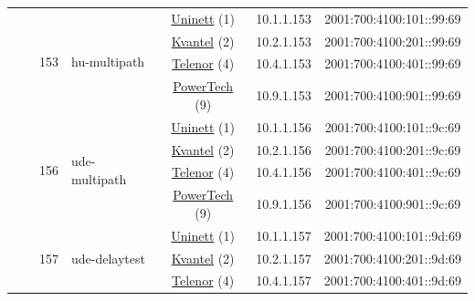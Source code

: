 \begin{small}
\begin{center}
\begin{longtable}{|c|c|c|c|c|c|c|c|}
  &  & \multirow{4}{*}{\tiny{153}} & \multicolumn{1}{|l|}{\multirow{4}{*}{\tiny{hu-multipath}}} & \multicolumn{2}{|c|}{\tiny{\href{https://www.uninett.no}{Uninett} (1)}} & \tiny{10.1.1.153} & \tiny{2001:700:4100:101::99:69} \\* \cline{5-5}\cline{6-6}\cline{7-7}\cline{8-8}
  &  &  &  & \multicolumn{2}{|c|}{\tiny{\href{http://kvantel.no}{Kvantel} (2)}} & \tiny{10.2.1.153} & \tiny{2001:700:4100:201::99:69} \\* \cline{5-5}\cline{6-6}\cline{7-7}\cline{8-8}
  &  &  &  & \multicolumn{2}{|c|}{\tiny{\href{https://www.telenor.no}{Telenor} (4)}} & \tiny{10.4.1.153} & \tiny{2001:700:4100:401::99:69} \\* \cline{5-5}\cline{6-6}\cline{7-7}\cline{8-8}
  &  &  &  & \multicolumn{2}{|c|}{\tiny{\href{http://www.powertech.no}{PowerTech} (9)}} & \tiny{10.9.1.153} & \tiny{2001:700:4100:901::99:69} \\* \cline{3-3}\cline{4-4}\cline{5-5}\cline{6-6}\cline{7-7}\cline{8-8}
  &  & \multirow{4}{*}{\tiny{156}} & \multicolumn{1}{|l|}{\multirow{4}{*}{\tiny{ude-multipath}}} & \multicolumn{2}{|c|}{\tiny{\href{https://www.uninett.no}{Uninett} (1)}} & \tiny{10.1.1.156} & \tiny{2001:700:4100:101::9c:69} \\* \cline{5-5}\cline{6-6}\cline{7-7}\cline{8-8}
  &  &  &  & \multicolumn{2}{|c|}{\tiny{\href{http://kvantel.no}{Kvantel} (2)}} & \tiny{10.2.1.156} & \tiny{2001:700:4100:201::9c:69} \\* \cline{5-5}\cline{6-6}\cline{7-7}\cline{8-8}
  &  &  &  & \multicolumn{2}{|c|}{\tiny{\href{https://www.telenor.no}{Telenor} (4)}} & \tiny{10.4.1.156} & \tiny{2001:700:4100:401::9c:69} \\* \cline{5-5}\cline{6-6}\cline{7-7}\cline{8-8}
  &  &  &  & \multicolumn{2}{|c|}{\tiny{\href{http://www.powertech.no}{PowerTech} (9)}} & \tiny{10.9.1.156} & \tiny{2001:700:4100:901::9c:69} \\* \cline{3-3}\cline{4-4}\cline{5-5}\cline{6-6}\cline{7-7}\cline{8-8}
  &  & \multirow{4}{*}{\tiny{157}} & \multicolumn{1}{|l|}{\multirow{4}{*}{\tiny{ude-delaytest}}} & \multicolumn{2}{|c|}{\tiny{\href{https://www.uninett.no}{Uninett} (1)}} & \tiny{10.1.1.157} & \tiny{2001:700:4100:101::9d:69} \\* \cline{5-5}\cline{6-6}\cline{7-7}\cline{8-8}
  &  &  &  & \multicolumn{2}{|c|}{\tiny{\href{http://kvantel.no}{Kvantel} (2)}} & \tiny{10.2.1.157} & \tiny{2001:700:4100:201::9d:69} \\* \cline{5-5}\cline{6-6}\cline{7-7}\cline{8-8}
  &  &  &  & \multicolumn{2}{|c|}{\tiny{\href{https://www.telenor.no}{Telenor} (4)}} & \tiny{10.4.1.157} & \tiny{2001:700:4100:401::9d:69} \\* \cline{5-5}\cline{6-6}\cline{7-7}\cline{8-8}

\end{longtable}
\end{center}
\end{small}
